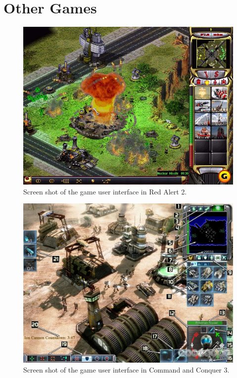 \section{Other Games}

\begin{figure}[H]
\begin{center}
\includegraphics[scale=0.4]{Images/red_alert_screenshot.png}
\end{center}
\caption{Screen shot of the game user interface in Red Alert 2.}
\label{pic:red_alert}
\end{figure}


\begin{figure}[H]
\begin{center}
\includegraphics[scale=0.3]{Images/coc_screenshot.png}
\end{center}
\caption{Screen shot of the game user interface in Command and Conquer 3.}
\label{pic:coc}
\end{figure}